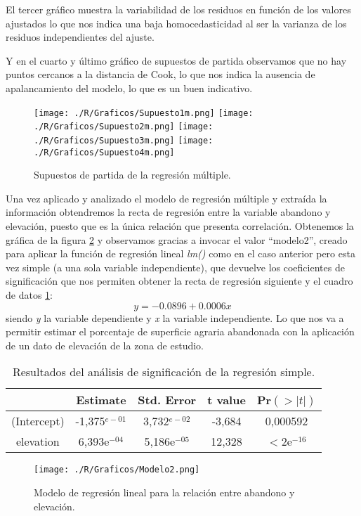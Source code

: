 \documentclass[11pt,a4paper]{article}
\begin{document}
El tercer gráfico muestra la variabilidad de los residuos en función de los valores ajustados lo que nos indica una baja homocedasticidad al ser la varianza de los residuos independientes del ajuste.

Y en el cuarto y último gráfico de supuestos de partida observamos que no hay puntos cercanos a la distancia de Cook, lo que nos indica la ausencia de apalancamiento del modelo, lo que es un buen indicativo.

\begin{figure}
\centering
\texttt{[image: ./R/Graficos/Supuesto1m.png]}
\texttt{[image: ./R/Graficos/Supuesto2m.png]}
\texttt{[image: ./R/Graficos/Supuesto3m.png]}
\texttt{[image: ./R/Graficos/Supuesto4m.png]}
\caption{Supuestos de partida de la regresión múltiple.}
\label{fig:sup.part}
\end{figure}

Una vez aplicado y analizado el modelo de regresión múltiple y extraída la información obtendremos la recta de regresión entre la variable abandono y elevación, puesto que es la única relación que presenta correlación. Obtenemos la gráfica de la figura \ref{fig:lm2} y observamos gracias a invocar el valor ``modelo2'', creado para aplicar la función de regresión lineal \textit{lm()} como en el caso anterior pero esta vez simple (a una sola variable independiente), que devuelve los coeficientes de significación que nos permiten obtener la recta de regresión siguiente y el cuadro de datos \ref{tab:coef.simpl}:
\begin{equation}
y=-0.0896+0.0006x
\label{eq:regre.elev}
\end{equation}
\noindent siendo \textit{y} la variable dependiente y \textit{x} la variable independiente. Lo que nos va a permitir estimar el porcentaje de superficie agraria abandonada con la aplicación de un dato de elevación de la zona de estudio.

\begin{table}[ht]
\centering
\begin{tabular}{ccccc}
\toprule[0.4mm]
& Estimate & Std. Error & t value & Pr$(>|t|)$\\
\midrule
(Intercept) & -1,375$^{e-01}$ & 3,732$^{e-02}$ & -3,684 & 0,000592\\
elevation & 6,393e$^{-04}$ & 5,186e$^{-05}$ & 12,328 & $<$2e$^{-16}$\\
\bottomrule[0.4mm]
\end{tabular}
\caption{Resultados del análisis de significación de la regresión simple.}
\label{tab:coef.simpl}
\end{table}

\begin{figure}
	\centering
	\texttt{[image: ./R/Graficos/Modelo2.png]}
	\caption{Modelo de regresión lineal para la relación entre abandono y elevación.}
	\label{fig:lm2}
\end{figure}
\end{document}
